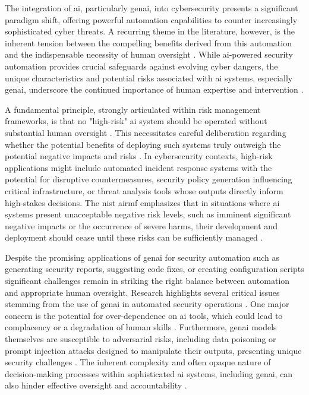 The integration of \gls{ai}, particularly \gls{genai}, into cybersecurity presents a significant paradigm shift, offering powerful automation capabilities to counter increasingly sophisticated cyber threats. A recurring theme in the literature, however, is the inherent tension between the compelling benefits derived from this automation and the indispensable necessity of human oversight \cite{seth_ai_2025}. While \gls{ai}-powered security automation provides crucial safeguards against evolving cyber dangers, the unique characteristics and potential risks associated with \gls{ai} systems, especially \gls{genai}, underscore the continued importance of human expertise and intervention \cite{seth_ai_2025, patel_generative_2025}.

A fundamental principle, strongly articulated within risk management frameworks, is that no "high-risk" \gls{ai} system should be operated without substantial human oversight \cite[p.7]{tabassi_artificial_2023}. This necessitates careful deliberation regarding whether the potential benefits of deploying such systems truly outweigh the potential negative impacts and risks \cite{tabassi_artificial_2023}. In cybersecurity contexts, high-risk applications might include automated incident response systems with the potential for disruptive countermeasures, security policy generation influencing critical infrastructure, or threat analysis tools whose outputs directly inform high-stakes decisions. The \gls{nist} \gls{airmf} emphasizes that in situations where \gls{ai} systems present unacceptable negative risk levels, such as imminent significant negative impacts or the occurrence of severe harms, their development and deployment should cease until these risks can be sufficiently managed \cite{tabassi_artificial_2023}.

Despite the promising applications of \gls{genai} for security automation such as generating security reports, suggesting code fixes, or creating configuration scripts significant challenges remain in striking the right balance between automation and appropriate human oversight. Research highlights several critical issues stemming from the use of \gls{genai} in automated security operations \cite{patel_generative_2025}. One major concern is the potential for over-dependence on \gls{ai} tools, which could lead to complacency or a degradation of human skills \cite{patel_generative_2025}. Furthermore, \gls{genai} models themselves are susceptible to adversarial risks, including data poisoning or prompt injection attacks designed to manipulate their outputs, presenting unique security challenges \cite{patel_generative_2025}. The inherent complexity and often opaque nature of decision-making processes within sophisticated \gls{ai} systems, including \gls{genai}, can also hinder effective oversight and accountability \cite{tabassi_artificial_2023} \cite{patel_generative_2025}.

